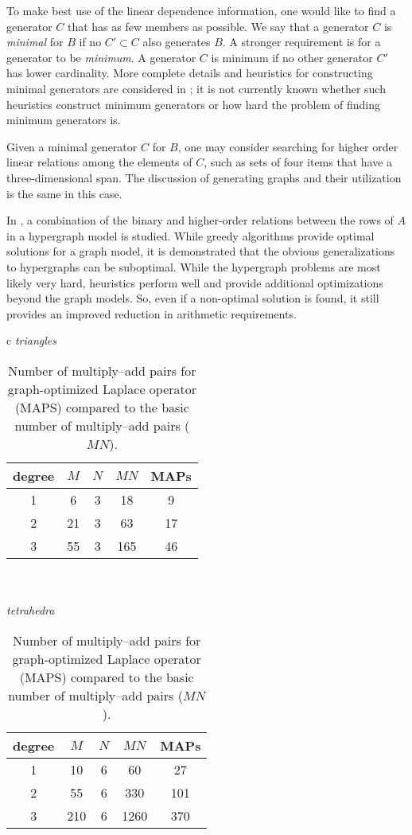 To make best use of the linear dependence information, one would like
to find a generator $C$ that has as few members as possible. We
say that a generator $C$ is \emph{minimal} for $B$ if no $C'
\subset C$ also generates $B$. A stronger requirement is for a
generator to be \emph{minimum}. A generator $C$ is minimum if no other
generator $C'$ has lower cardinality. More complete details and
heuristics for constructing minimal generators are considered
in \citet{KirbyScott2007}; it is not currently known whether such
heuristics construct minimum generators or how hard the problem of
finding minimum generators is.

Given a minimal generator $C$ for $B$, one may consider searching for
higher order linear relations among the elements of $C$, such as sets
of four items that have a three-dimensional span. The discussion of
generating graphs and their utilization is the same in this case.

In \citet{WolfHeath2009}, a combination of the binary and
higher-order relations between the rows of $A$ in a hypergraph model is studied.
While greedy algorithms provide optimal solutions for a graph model,
it is demonstrated that the obvious generalizations to hypergraphs can
be suboptimal. While the hypergraph problems are most likely very
hard, heuristics perform well and provide additional optimizations
beyond the graph models. So, even if a non-optimal solution is found,
it still provides an improved reduction in arithmetic requirements.

\begin{table}
  \center
    \begin{tabular}{c}
      \emph{triangles} \\
      \begin{tabular}{|c|ccc|c|}\hline
        degree & $M$ & $N$ & $MN$ & MAPs \\
        \hline
        \hline
        1 &6 &3& 18& 9 \\
        2 &21& 3& 63& 17\\
        3 &55& 3& 165& 46 \\\hline
      \end{tabular}
      \\
      \\
      \emph{tetrahedra} \\
      \begin{tabular}{|c|ccc|c|}\hline
        degree & $M$ & $N$ & $MN$ & MAPs \\
        \hline
        \hline
        1 & 10 & 6 &60 &27 \\
        2 & 55 & 6 & 330 &101 \\
        3 & 210 &6 &1260 &370 \\\hline
      \end{tabular}
    \end{tabular}
    \caption{Number of multiply--add pairs for graph-optimized Laplace
      operator (MAPS) compared to the basic number of multiply--add pairs
      ($MN$).}
    \label{tab:kirby-4:graph}
\end{table}

